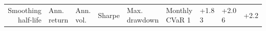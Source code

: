 \begin{tabular}{rlllllll}
\toprule
Smoothing half-life & Ann. return & Ann. vol. & Sharpe & Max. drawdown & Monthly CVaR 1%
 & +1.8%
3 & +2.0%
6 & +2.2%
\bottomrule
\end{tabular}

